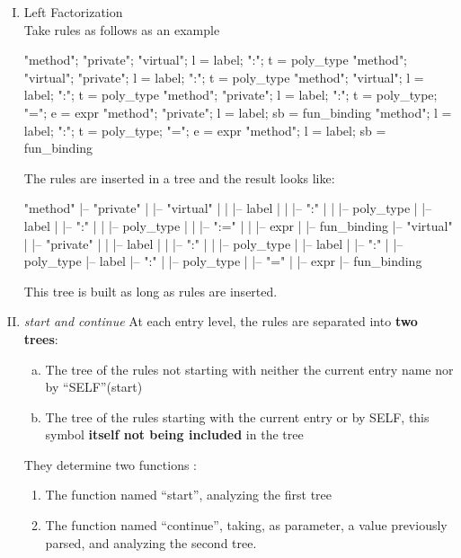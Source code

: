 \begin{enumerate}[(I)]
  \item Left Factorization \\
    Take rules as follows as an example 
    \begin{ocamlcode}
  "method"; "private"; "virtual"; l = label; ":"; t = poly_type
  "method"; "virtual"; "private"; l = label; ":"; t = poly_type
  "method"; "virtual"; l = label; ":"; t = poly_type
  "method"; "private"; l = label; ":"; t = poly_type; "="; e = expr
  "method"; "private"; l = label; sb = fun_binding
  "method"; l = label; ":"; t = poly_type; "="; e = expr
  "method"; l = label; sb = fun_binding
\end{ocamlcode}

The rules are inserted in a tree and the result looks like:
\begin{ocamlcode}
  "method"
     |-- "private"
     |       |-- "virtual"
     |       |       |-- label
     |       |             |-- ":"
     |       |                  |-- poly_type
     |       |-- label
     |             |-- ":"
     |             |    |-- poly_type
     |             |            |-- ":="
     |             |                 |-- expr
     |             |-- fun_binding
     |-- "virtual"
     |       |-- "private"
     |       |       |-- label
     |       |             |-- ":"
     |       |                  |-- poly_type
     |       |-- label
     |             |-- ":"
     |                  |-- poly_type
     |-- label
           |-- ":"
           |    |-- poly_type
           |            |-- "="
           |                 |-- expr
           |-- fun_binding
      
    \end{ocamlcode}

This tree is built as long as rules are inserted.
\item \textit{start and continue}
  At each entry level, the rules are separated into \textbf{two
    trees}:
  \begin{enumerate}[(a)]
  \item The tree of the rules not starting with neither the current entry name
    nor by ``SELF''(start)
  \item The tree of the rules starting with the current entry or by
    SELF, this symbol \textbf{itself not being included} in the tree
  \end{enumerate}

  They determine two functions :
  \begin{enumerate}
  \item The function named {\color{red} ``start''}, analyzing the first tree
  \item The function named {\color{red} ``continue''}, taking, as parameter, a value
    previously parsed, and analyzing the second tree. 
  \end{enumerate}


\end{enumerate}
